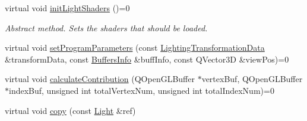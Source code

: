 \begin{DoxyCompactItemize}
virtual void \mbox{\hyperlink{class_geometry_engine_1_1_geometry_world_item_1_1_geometry_light_1_1_light_a7bcd2133b4b691496691148e73c5411b}{init\+Light\+Shaders}} ()=0
\begin{DoxyCompactList}\small\item\em Abstract method. Sets the shaders that should be loaded. \end{DoxyCompactList}\item 
virtual void \mbox{\hyperlink{class_geometry_engine_1_1_geometry_world_item_1_1_geometry_light_1_1_light_a108d5b6143e4c55113f7656224f9799f}{set\+Program\+Parameters}} (const \mbox{\hyperlink{class_geometry_engine_1_1_lighting_transformation_data}{Lighting\+Transformation\+Data}} \&transform\+Data, const \mbox{\hyperlink{class_geometry_engine_1_1_buffers_info}{Buffers\+Info}} \&buff\+Info, const Q\+Vector3D \&view\+Pos)=0
\item 
virtual void \mbox{\hyperlink{class_geometry_engine_1_1_geometry_world_item_1_1_geometry_light_1_1_light_a58aa2a3520f7aa2b03afcb4123e7530a}{calculate\+Contribution}} (Q\+Open\+G\+L\+Buffer $\ast$vertex\+Buf, Q\+Open\+G\+L\+Buffer $\ast$index\+Buf, unsigned int total\+Vertex\+Num, unsigned int total\+Index\+Num)=0
\item 
virtual void \mbox{\hyperlink{class_geometry_engine_1_1_geometry_world_item_1_1_geometry_light_1_1_light_ae3f695bb7e3d4fd3a02bdffaddd07c1a}{copy}} (const \mbox{\hyperlink{class_geometry_engine_1_1_geometry_world_item_1_1_geometry_light_1_1_light}{Light}} \&ref)
\end{DoxyCompactItemize}
